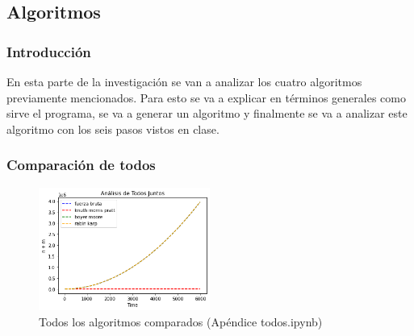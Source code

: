 \documentclass[stu, 11pt, letterpaper, donotrepeattitle, floatsintext, natbib, helv]{apa7}
\begin{document}
\begin{singlespace}




\part*{Algoritmos}

\section*{Introducción}
\quad En esta parte de la investigación se van a analizar los cuatro algoritmos previamente mencionados. Para esto se va a explicar en términos generales como sirve el programa, se va a generar un algoritmo y finalmente se va a analizar este algoritmo con los seis pasos vistos en clase.









\section*{Comparación de todos}


\begin{figure} [H]
    \includegraphics[width=0.5\textwidth]{../codigoPythonJupyter/Todos.png}
    \caption{Todos los algoritmos comparados (Apéndice todos.ipynb)}
    \label{fig:all}
\end{figure}


\end{singlespace}
\end{document}
